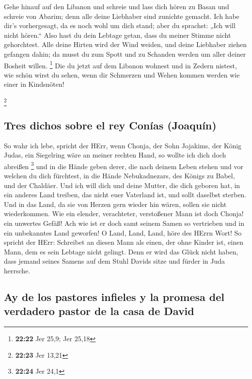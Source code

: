  Gehe hinauf auf den Libanon und schreie und lass dich
hören zu Basan und schreie von Abarim; denn alle deine Liebhaber sind
zunichte gemacht.  Ich habe dir's vorhergesagt, da es
noch wohl um dich stand; aber du sprachst: „Ich will nicht hören.`` Also
hast du dein Lebtage getan, dass du meiner Stimme nicht gehorchtest.
 Alle deine Hirten wird der Wind weiden, und deine
Liebhaber ziehen gefangen dahin; da musst du zum Spott und zu Schanden
werden um aller deiner Bosheit willen. \footnote{\textbf{22:22} Jer
  25,9; Jer 25,18}  Die du jetzt auf dem Libanon wohnest
und in Zedern nistest, wie schön wirst du sehen, wenn dir Schmerzen und
Wehen kommen werden wie einer in Kindsnöten!

\footnote{\textbf{22:23} Jer 13,21}

\hypertarget{tres-dichos-sobre-el-rey-conuxedas-joaquuxedn}{%
\subsection{Tres dichos sobre el rey Conías
(Joaquín)}\label{tres-dichos-sobre-el-rey-conuxedas-joaquuxedn}}

 So wahr ich lebe, spricht der HErr, wenn Chonja, der
Sohn Jojakims, der König Judas, ein Siegelring wäre an meiner rechten
Hand, so wollte ich dich doch abreißen \footnote{\textbf{22:24} Jer 24,1}
 und in die Hände geben derer, die nach deinem Leben
stehen und vor welchen du dich fürchtest, in die Hände Nebukadnezars,
des Königs zu Babel, und der Chaldäer.  Und ich will dich
und deine Mutter, die dich geboren hat, in ein anderes Land treiben, das
nicht euer Vaterland ist, und sollt daselbst sterben. 
Und in das Land, da sie von Herzen gern wieder hin wären, sollen sie
nicht wiederkommen.  Wie ein elender, verachteter,
verstoßener Mann ist doch Chonja! ein unwertes Gefäß! Ach wie ist er
doch samt seinem Samen so vertrieben und in ein unbekanntes Land
geworfen!  O Land, Land, Land, höre des HErrn Wort!
 So spricht der HErr: Schreibet an diesen Mann als einen,
der ohne Kinder ist, einen Mann, dem es sein Lebtage nicht gelingt. Denn
er wird das Glück nicht haben, dass jemand seines Samens auf dem Stuhl
Davids sitze und fürder in Juda herrsche.

\hypertarget{ay-de-los-pastores-infieles-y-la-promesa-del-verdadero-pastor-de-la-casa-de-david}{%
\subsection{Ay de los pastores infieles y la promesa del verdadero
pastor de la casa de
David}\label{ay-de-los-pastores-infieles-y-la-promesa-del-verdadero-pastor-de-la-casa-de-david}}

